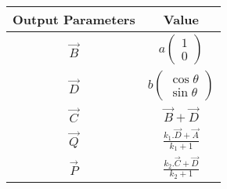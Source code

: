 \begin{tabular}{|c|c|}
\hline
    \textbf{Output Parameters} &\textbf{Value} \\
    \hline
     $\vec{B}$&$a\begin{pmatrix}
         1\\0
     \end{pmatrix}$\\
     \hline
     $\vec{D}$&$b\begin{pmatrix}
         \cos{\theta}\\\sin{\theta}
     \end{pmatrix}$\\
     \hline
     $\vec{C}$&$\vec{B}+\vec{D}$\\
     \hline
      $\vec{ Q}$ & $\frac{k_1.\vec{D}+\vec{A}}{k_1+1}$\\
     \hline
      $\vec{P}$ &$\frac{k_2.\vec{C}+\vec{D}}{k_2+1}$\\
   \hline
\end{tabular}

